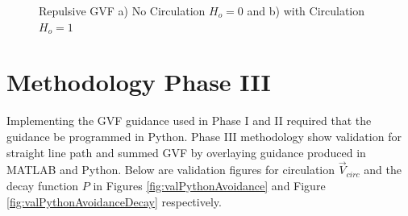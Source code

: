 \documentclass[numbered,pdftex]{ohio-etd}
\begin{document}
\begin{figure}[H]
	\begin{subfigmatrix}{2}%
		\centering	
		\hspace*{0mm}
	\end{subfigmatrix}
	\caption{Repulsive GVF a) No Circulation $H_o=0$ and b) with Circulation $H_o=1$}
	\label{fig:decayApplied}
\end{figure} 


\chapter{Methodology Phase III}

Implementing the GVF guidance used in Phase I and II required that the guidance be programmed in Python. Phase III methodology show validation for straight line path and summed GVF by overlaying guidance produced in MATLAB and Python. Below are validation figures for circulation $\overrightarrow{V}_{circ}$ and the decay function $P$ in Figures \ref{fig:valPythonAvoidance} and Figure \ref{fig:valPythonAvoidanceDecay} respectively.
\end{document}
